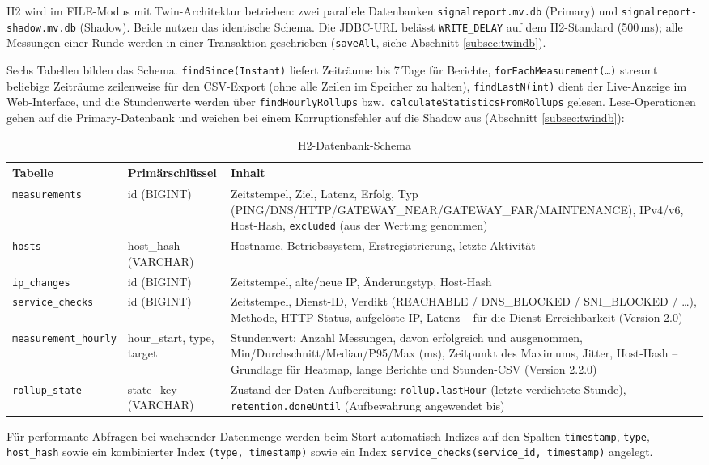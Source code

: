 H2 wird im FILE-Modus mit Twin-Architektur betrieben: zwei parallele Datenbanken
\texttt{signalreport.mv.db} (Primary) und \texttt{signalreport-shadow.mv.db} (Shadow).
Beide nutzen das identische Schema. Die JDBC-URL belässt \texttt{WRITE\_DELAY} auf dem
H2-Standard (500\,ms); alle Messungen einer Runde werden in einer Transaktion geschrieben
(\texttt{saveAll}, siehe Abschnitt \ref{subsec:twindb}).

Sechs Tabellen bilden das Schema. \texttt{findSince(Instant)} liefert Zeiträume bis
7\,Tage für Berichte, \texttt{forEachMeasurement(\dots)} streamt beliebige Zeiträume
zeilenweise für den CSV-Export (ohne alle Zeilen im Speicher zu halten),
\texttt{findLastN(int)} dient der Live-Anzeige im Web-Interface, und die Stundenwerte
werden über \texttt{findHourlyRollups} bzw.\ \texttt{calculateStatisticsFromRollups}
gelesen. Lese-Operationen gehen auf die Primary-Datenbank und weichen bei einem
Korruptionsfehler auf die Shadow aus (Abschnitt \ref{subsec:twindb}):

\begin{table}[h]
\centering
\begin{tabular}{|l|l|p{6cm}|}
\hline
\textbf{Tabelle} & \textbf{Primärschlüssel} & \textbf{Inhalt} \\
\hline
\texttt{measurements} & id (BIGINT) & Zeitstempel, Ziel, Latenz, Erfolg, Typ
  (PING/DNS/HTTP/GATEWAY\_NEAR/GATEWAY\_FAR/MAINTENANCE), IPv4/v6, Host-Hash,
  \texttt{excluded} (aus der Wertung genommen) \\
\hline
\texttt{hosts} & host\_hash (VARCHAR) & Hostname, Betriebssystem, Erstregistrierung,
  letzte Aktivität \\
\hline
\texttt{ip\_changes} & id (BIGINT) & Zeitstempel, alte/neue IP, Änderungstyp,
  Host-Hash \\
\hline
\texttt{service\_checks} & id (BIGINT) & Zeitstempel, Dienst-ID, Verdikt
  (REACHABLE / DNS\_BLOCKED / SNI\_BLOCKED / \ldots), Methode, HTTP-Status,
  aufgelöste IP, Latenz -- für die Dienst-Erreichbarkeit (Version 2.0) \\
\hline
\texttt{measurement\_hourly} & hour\_start, type, target & Stundenwert: Anzahl Messungen,
  davon erfolgreich und ausgenommen, Min/Durchschnitt/Median/P95/Max (ms), Zeitpunkt des
  Maximums, Jitter, Host-Hash -- Grundlage für Heatmap, lange Berichte und Stunden-CSV
  (Version 2.2.0) \\
\hline
\texttt{rollup\_state} & state\_key (VARCHAR) & Zustand der Daten-Aufbereitung:
  \texttt{rollup.lastHour} (letzte verdichtete Stunde), \texttt{retention.doneUntil}
  (Aufbewahrung angewendet bis) \\
\hline
\end{tabular}
\caption{H2-Datenbank-Schema}
\label{tab:dbschema}
\end{table}

Für performante Abfragen bei wachsender Datenmenge werden beim Start automatisch
Indizes auf den Spalten \texttt{timestamp}, \texttt{type}, \texttt{host\_hash} sowie
ein kombinierter Index \texttt{(type, timestamp)} sowie ein Index
\texttt{service\_checks(service\_id, timestamp)} angelegt.
